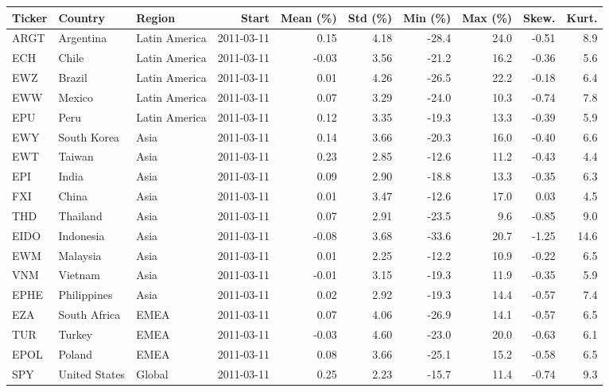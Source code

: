 \begin{tabular}{lllrrrrrrr}
\toprule
Ticker & Country & Region & Start & Mean (\%) & Std (\%) & Min (\%) & Max (\%) & Skew. & Kurt. \\
\midrule
ARGT & Argentina & Latin America & 2011-03-11 & 0.15 & 4.18 & -28.4 & 24.0 & -0.51 & 8.9 \\
ECH & Chile & Latin America & 2011-03-11 & -0.03 & 3.56 & -21.2 & 16.2 & -0.36 & 5.6 \\
EWZ & Brazil & Latin America & 2011-03-11 & 0.01 & 4.26 & -26.5 & 22.2 & -0.18 & 6.4 \\
EWW & Mexico & Latin America & 2011-03-11 & 0.07 & 3.29 & -24.0 & 10.3 & -0.74 & 7.8 \\
EPU & Peru & Latin America & 2011-03-11 & 0.12 & 3.35 & -19.3 & 13.3 & -0.39 & 5.9 \\
EWY & South Korea & Asia & 2011-03-11 & 0.14 & 3.66 & -20.3 & 16.0 & -0.40 & 6.6 \\
EWT & Taiwan & Asia & 2011-03-11 & 0.23 & 2.85 & -12.6 & 11.2 & -0.43 & 4.4 \\
EPI & India & Asia & 2011-03-11 & 0.09 & 2.90 & -18.8 & 13.3 & -0.35 & 6.3 \\
FXI & China & Asia & 2011-03-11 & 0.01 & 3.47 & -12.6 & 17.0 & 0.03 & 4.5 \\
THD & Thailand & Asia & 2011-03-11 & 0.07 & 2.91 & -23.5 & 9.6 & -0.85 & 9.0 \\
EIDO & Indonesia & Asia & 2011-03-11 & -0.08 & 3.68 & -33.6 & 20.7 & -1.25 & 14.6 \\
EWM & Malaysia & Asia & 2011-03-11 & 0.01 & 2.25 & -12.2 & 10.9 & -0.22 & 6.5 \\
VNM & Vietnam & Asia & 2011-03-11 & -0.01 & 3.15 & -19.3 & 11.9 & -0.35 & 5.9 \\
EPHE & Philippines & Asia & 2011-03-11 & 0.02 & 2.92 & -19.3 & 14.4 & -0.57 & 7.4 \\
EZA & South Africa & EMEA & 2011-03-11 & 0.07 & 4.06 & -26.9 & 14.1 & -0.57 & 6.5 \\
TUR & Turkey & EMEA & 2011-03-11 & -0.03 & 4.60 & -23.0 & 20.0 & -0.63 & 6.1 \\
EPOL & Poland & EMEA & 2011-03-11 & 0.08 & 3.66 & -25.1 & 15.2 & -0.58 & 6.5 \\
SPY & United States & Global & 2011-03-11 & 0.25 & 2.23 & -15.7 & 11.4 & -0.74 & 9.3 \\
\bottomrule
\end{tabular}
